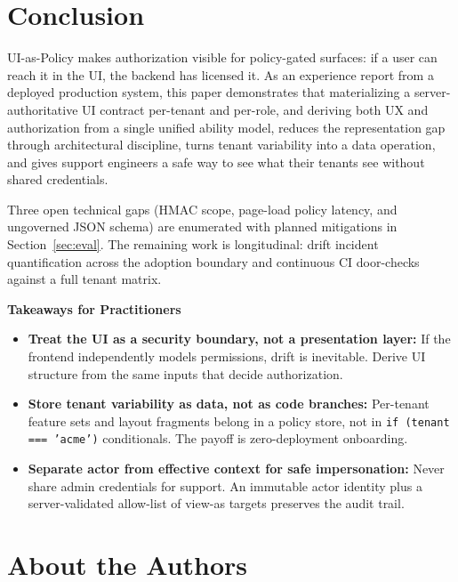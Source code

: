 \documentclass[10pt,journal]{IEEEtran}
\newcommand{\uiPolicy}{UI-as-Policy}
\newcommand{\viewas}{view-as}
\newcommand{\code}[1]{{\small\textcolor{CausifyBlue}{\texttt{#1}}}}
\begin{document}
\section{Conclusion}\label{sec:conclusion}

\uiPolicy{} makes authorization visible for policy-gated surfaces: if a user
can reach it in the UI, the backend has licensed it. As an experience report from a deployed
production system, this paper demonstrates that materializing a
server-authoritative UI contract per-tenant and per-role, and deriving both
UX and authorization from a single unified ability model, reduces the
representation gap through architectural discipline, turns tenant variability into
a data operation, and gives support engineers a safe way to see what their
tenants see without shared credentials.

Three open technical gaps (HMAC scope, page-load policy latency, and
ungoverned JSON schema) are enumerated with planned mitigations in
Section~\ref{sec:eval}. The remaining work is longitudinal: drift incident
quantification across the adoption boundary and continuous CI door-checks
against a full tenant matrix.

\noindent\textbf{Takeaways for Practitioners}
\begin{itemize}[label=\textbullet, leftmargin=1.2em, topsep=2pt, itemsep=1pt, parsep=0pt, partopsep=0pt]
  \item \textbf{Treat the UI as a security boundary, not a presentation
    layer:} If the frontend independently models permissions, drift is
    inevitable. Derive UI structure from the same inputs that decide
    authorization.
  \item \textbf{Store tenant variability as data, not as code branches:}
    Per-tenant feature sets and layout fragments belong in a policy
    store, not in \code{if (tenant === 'acme')} conditionals. The
    payoff is zero-deployment onboarding.
  \item \textbf{Separate actor from effective context for safe
    impersonation:} Never share admin credentials for support. An
    immutable actor identity plus a server-validated allow-list of
    \viewas{} targets preserves the audit trail.
\end{itemize}




\section*{About the Authors}
\end{document}
